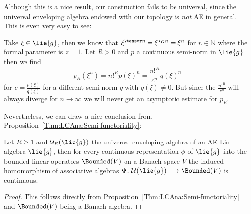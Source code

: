 Although this is a nice result, our construction fails to be
universal, since the universal enveloping algebra endowed with our
topology is \emph{not} AE in general. This is even very easy to see:
\begin{example}
    Take $\xi \in \lie{g}$, then we know that $\xi^{\tensor n} =
    \xi^{\ostar_G n} = \xi^n$ for $n \in \mathbb{N}$ where the formal
    parameter is $z = 1$. Let $R > 0$ and $p$ a continuous semi-norm
    in $\lie{g}$ then we find
    \begin{equation}
        p_R(\xi^n)
        =
        n!^R p(\xi)^n
        =
        \frac{n!^R}{c^n} q(\xi)^n
    \end{equation}
    for $c = \frac{p(\xi)}{q(\xi)}$ for a different semi-norm $q$ with
    $q(\xi) \neq 0$.  But since the $\frac{n!^R}{c^n}$ will always
    diverge for $n \rightarrow \infty$ we will never get an asymptotic
    estimate for $p_R$.
\end{example}
Nevertheless, we can draw a nice conclusion from
Proposition~\ref{Thm:LCAna:Semi-functoriality}:
\begin{proposition}
    \label{Thm:LCAna:ContinuousRepresentations}%
    Let $R \geq 1$ and $\mathcal{U}_R(\lie{g})$ the universal
    enveloping algebra of an AE-Lie algebra $\lie{g}$, then for every
    continuous representation $\phi$ of $\lie{g}$ into the bounded
    linear operators $\Bounded(V)$ on a Banach space $V$ the induced
    homomorphism of associative algebras $\Phi \colon
    \mathcal{U}(\lie{g}) \longrightarrow \Bounded(V)$ is continuous.
\end{proposition}
\begin{proof}
    This follows directly from
    Proposition~\ref{Thm:LCAna:Semi-functoriality} and $\Bounded(V)$
    being a Banach algebra.
\end{proof}
